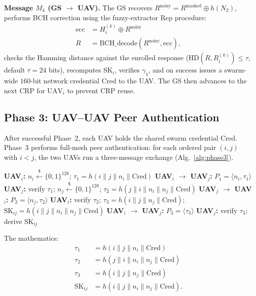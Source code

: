 \documentclass[journal,a4paper,10pt]{IEEEtran}
\begin{document}
\textbf{Message $M_4$ (GS $\to$ UAV).} The GS recovers
$R^{\mathrm{noisy}} = R^{\mathrm{masked}} \oplus h(N_2)$, performs BCH
correction using the fuzzy-extractor Rep procedure:
\begin{align}
\mathrm{ecc} &= H_i^{(k)} \oplus R^{\mathrm{noisy}} \\
R &= \mathrm{BCH\_decode}(R^{\mathrm{noisy}}, \mathrm{ecc}),
\end{align}
checks the Hamming distance against the enrolled response
($\mathrm{HD}(R, R_i^{(k)}) \le \tau$, default $\tau{=}24$ bits),
recomputes $\mathrm{SK}_i$, verifies $\gamma_1$, and on success
issues a swarm-wide $160$-bit network credential $\mathrm{Cred}$ to
the UAV. The GS then advances to the next CRP for $\mathrm{UAV}_i$
to prevent CRP reuse.

\subsection{Phase 3: UAV--UAV Peer Authentication}
After successful Phase~2, each UAV holds the shared swarm credential
$\mathrm{Cred}$. Phase~3 performs full-mesh peer authentication: for
each ordered pair $(i,j)$ with $i{<}j$, the two UAVs run a
three-message exchange (Alg.~\ref{alg:phase3}).

\begin{algorithm}[t]
\caption{Phase 3 UAV--UAV Peer Authentication}
\label{alg:phase3}
\begin{algorithmic}[1]
\STATE \textbf{UAV$_i$:} $n_i \xleftarrow{\$} \{0,1\}^{128}$;
  $\tau_1 = h(i\|j\|n_i\|\mathrm{Cred})$
\STATE \textbf{UAV$_i$ $\to$ UAV$_j$:} $P_1 = \langle n_i, \tau_1 \rangle$
\STATE \textbf{UAV$_j$:} verify $\tau_1$;
  $n_j \xleftarrow{\$} \{0,1\}^{128}$;
  $\tau_2 = h(j\|i\|n_i\|n_j\|\mathrm{Cred})$
\STATE \textbf{UAV$_j$ $\to$ UAV$_i$:} $P_2 = \langle n_j, \tau_2 \rangle$
\STATE \textbf{UAV$_i$:} verify $\tau_2$;
  $\tau_3 = h(i\|j\|n_j\|\mathrm{Cred})$;
  $\mathrm{SK}_{ij} = h(i\|j\|n_i\|n_j\|\mathrm{Cred})$
\STATE \textbf{UAV$_i$ $\to$ UAV$_j$:} $P_3 = \langle \tau_3 \rangle$
\STATE \textbf{UAV$_j$:} verify $\tau_3$;
  derive $\mathrm{SK}_{ij}$
\end{algorithmic}
\end{algorithm}

The mathematics:
\begin{align}
\tau_1 &= h(i \| j \| n_i \| \mathrm{Cred}) \\
\tau_2 &= h(j \| i \| n_i \| n_j \| \mathrm{Cred}) \\
\tau_3 &= h(i \| j \| n_j \| \mathrm{Cred}) \\
\mathrm{SK}_{ij} &= h(i \| j \| n_i \| n_j \| \mathrm{Cred}).
\end{align}
\end{document}
